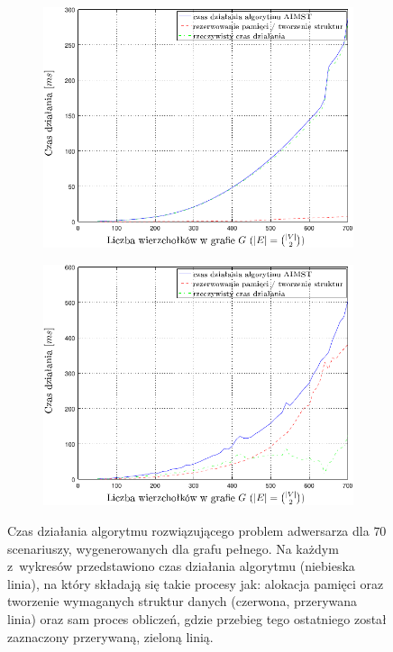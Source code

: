 \begin{figure}[!htbp]
	\renewcommand\figurename{Wykres}
	\ContinuedFloat
	\null\hfill
	\begin{subfigure}[b]{0.45\textwidth}
		\includegraphics[width=\textwidth]{Chapter_VI/AIMST1-example/AIMST1_psfrag}
		\caption{}
		\label{fig:aimst1:a}
	\end{subfigure}
	\hfill
	\begin{subfigure}[b]{0.45\textwidth}
		\includegraphics[width=\textwidth]{Chapter_VI/AIMST2-example/AIMST2_psfrag}
		\caption{}
		\label{fig:aimst1:b}
	\end{subfigure}
	\hfill\null
	\caption{
		Czas działania algorytmu rozwiązującego problem adwersarza dla $70$ scenariuszy, wygenerowanych dla grafu pełnego. Na każdym z~wykresów przedstawiono czas działania algorytmu (niebieska linia), na który składają się takie procesy jak: alokacja pamięci oraz tworzenie wymaganych struktur danych (czerwona, przerywana linia) oraz sam proces obliczeń, gdzie przebieg tego ostatniego został zaznaczony przerywaną, zieloną linią.
}
\end{figure}
